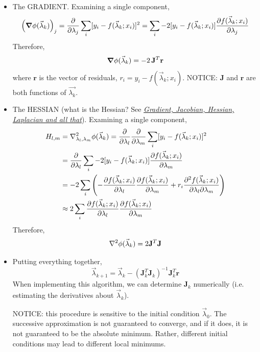 \documentclass[12pt]{article}
\numberwithin{equation}{section}
\begin{document}
\begin{itemize}
\item The GRADIENT. Examining a single component,
\begin{equation}
		\left(\grad{\phi(\vec{\lambda}_k)}\right)_j = \pdv{}{\lambda_j}\sum_i [y_i - f(\vec{\lambda}_k;x_i)]^2 = \sum_i -2[y_i - f(\vec{\lambda}_k;x_i)]\pdv{f(\vec{\lambda}_k; x_i)}{\lambda_j} 
\end{equation}
Therefore,
\begin{equation}
		\grad{\phi(\vec{\lambda}_k)} = -2\,\mathbf{J}^T \mathbf{r}
\end{equation}
where $ \mathbf{r}$ is the vector of residuals, $ r_i =  y_i - f(\vec{\lambda}_k;x_i)$. NOTICE: $ \mathbf{J} $ and $ \mathbf{r} $ are both functions of $ \vec{\lambda_k} $.
\item The HESSIAN (what is the Hessian? See \href{https://najeebkhan.github.io/blog/VecCal.html}{\textit{Gradient, Jacobian, Hessian, Laplacian and all that}}). Examining a single component,
\begin{align*}
		H_{l,m} &= \laplacian_{\lambda_l,\lambda_m} {\phi(\vec{\lambda}_k)} = \pdv{\lambda_l}\pdv{\lambda_m}\sum_i [y_i - f(\vec{\lambda}_k;x_i)]^2 \\
		&=  \pdv{\lambda_l} \sum_i -2[y_i - f(\vec{\lambda}_k;x_i)]\pdv{f(\vec{\lambda}_k; x_i)}{\lambda_m} \\
		&= -2\sum_i \left(-\pdv{f(\vec{\lambda}_k; x_i)}{\lambda_l}\pdv{f(\vec{\lambda}_k; x_i)}{\lambda_m} + r_i\pdv{f(\vec{\lambda}_k; x_i)}{\lambda_l}{\lambda_m} \right)\\
		& \approx  2\sum_i \pdv{f(\vec{\lambda}_k; x_i)}{\lambda_l}\pdv{f(\vec{\lambda}_k; x_i)}{\lambda_m} 
\end{align*}
Therefore,
\begin{equation}
		\laplacian{\phi(\vec{\lambda}_k)}= 2\mathbf{J}^T \mathbf{J}
\end{equation}
\item Putting everything together,
\begin{equation}
			\vec{\lambda}_{k+1} = 	\vec{\lambda}_{k} - (\mathbf{J}_k^T \mathbf{J}_k)^{-1}\mathbf{J}_k^T\mathbf{r}
\end{equation}
When implementing this algorithm, we can determine $ \mathbf{J}_k $ numerically (i.e. estimating the derivatives about $ \vec{\lambda}_k $). 

NOTICE: this procedure is sensitive to the initial condition $ \vec{\lambda}_0 $. The successive approximation is not guaranteed to converge, and if it does, it is not guaranteed to be the absolute minimum. Rather, different initial conditions may lead to different local minimums.

\end{itemize}
\end{document}
